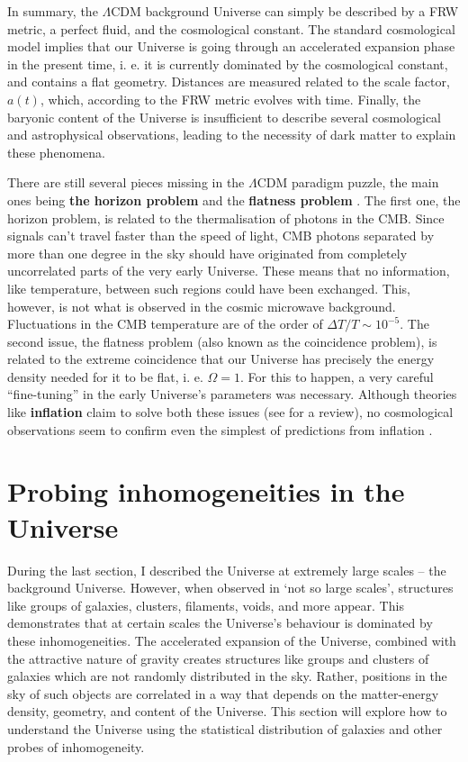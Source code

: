 \qquad In summary, the $\Lambda$CDM background Universe can simply be described by a FRW metric, a perfect fluid, and the cosmological constant. The standard cosmological model implies that our Universe is going through an accelerated expansion phase in the present time, i. e. it is currently dominated by the cosmological constant, and contains a flat geometry. Distances are measured related to the scale factor, $a(t)$, which, according to the FRW metric evolves with time. Finally, the baryonic content of the Universe is insufficient to describe several cosmological and astrophysical observations, leading to the necessity of dark matter to explain these phenomena. 

\qquad There are still several pieces missing in the $\Lambda$CDM paradigm puzzle, the main ones being \textbf{the horizon problem} and the \textbf{flatness problem} \citep{1994Hu-Flatness-Horizon,2005Lake-PRL-Flatness,2012Helbig-flatness}. The first one, the horizon problem, is related to the thermalisation of photons in the CMB. Since signals can't travel faster than the speed of light, CMB photons separated by more than one degree in the sky should have originated from completely uncorrelated parts of the very early Universe. These means that no information, like temperature, between such regions could have been exchanged. This, however, is not what is observed in the cosmic microwave background. Fluctuations in the CMB temperature are of the order of $\Delta T/T \sim 10^{-5}$. The second issue, the flatness problem (also known as the coincidence problem), is related to the extreme coincidence that our Universe has precisely the energy density needed for it to be flat, i. e. $\Omega = 1$. For this to happen, a very careful ``fine-tuning'' in the early Universe's parameters was necessary. Although theories like \textbf{inflation} claim to solve both these issues (see \citealt{2008InflationReview} for a review), no cosmological observations seem to confirm even the simplest of predictions from inflation \citep{2014Bicep2Planck}.

\vspace{10mm}
\section{Probing inhomogeneities in the Universe}
During the last section, I described the Universe at extremely large scales -- the background Universe. However, when observed in `not so large scales', structures like groups of galaxies, clusters, filaments, voids, and more appear. This demonstrates that at certain scales the Universe's behaviour is dominated by these inhomogeneities. The accelerated expansion of the Universe, combined with the attractive nature of gravity creates structures like groups and clusters of galaxies which are not randomly distributed in the sky. Rather, positions in the sky of such objects are correlated in a way that depends on the matter-energy density, geometry, and content of the Universe. This section will explore how to understand the Universe using the statistical distribution of galaxies and other probes of inhomogeneity.

